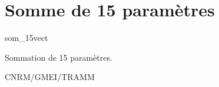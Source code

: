 %
\section{Somme de 15 param\`etres}

 {\sf som\_15vect}

Sommation de 15 param\`etres.

\bigskip





CNRM/GMEI/TRAMM

